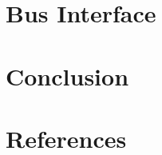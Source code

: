 \documentclass{article}
\begin{document}

\section{Bus Interface}


\section{Conclusion}


\clearpage

\pagebreak
\renewcommand*{\refname}{\vspace{-8mm}}
\section{References}
%


\end{document}
